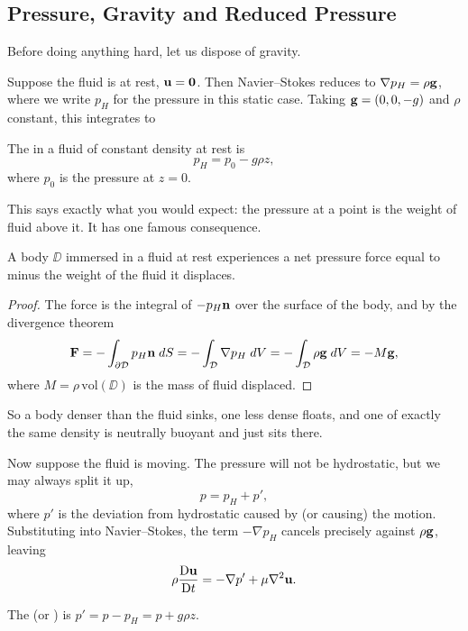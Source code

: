 \documentclass[a4paper]{scrartcl}
\newcommand{\D}{\mathrm{D}}
\newcommand{\Dt}[1]{\frac{\D #1}{\D t}}
\begin{document}
\subsection{Pressure, Gravity and Reduced Pressure}

Before doing anything hard, let us dispose of gravity.

Suppose the fluid is at rest, $\mathbf{u} = \mathbf{0}$. Then Navier--Stokes reduces to $\nabla p_H = \rho \mathbf{g}$, where we write $p_H$ for the pressure in this static case. Taking $\mathbf{g} = (0, 0, -g)$ and $\rho$ constant, this integrates to

\begin{definition}
	The  in a fluid of constant density at rest is
	$$
	p_H = p_0 - g \rho z,
	$$
	where $p_0$ is the pressure at $z = 0$.
\end{definition}

This says exactly what you would expect: the pressure at a point is the weight of fluid above it. It has one famous consequence.

\begin{proposition}
	A body $\DD$ immersed in a fluid at rest experiences a net pressure force equal to minus the weight of the fluid it displaces.
\end{proposition}
\begin{proof}
	The force is the integral of $-p_H \mathbf{n}$ over the surface of the body, and by the divergence theorem
	$$
	\mathbf{F} = -\int_{\partial \mathcal{D}} p_H \mathbf{n} \; d S = -\int_{\mathcal{D}} \nabla p_H \; d V = -\int_{\mathcal{D}} \rho \mathbf{g} \; d V = -M \mathbf{g},
	$$
	where $M = \rho \, \mathrm{vol}(\DD)$ is the mass of fluid displaced. \qedhere
\end{proof}

So a body denser than the fluid sinks, one less dense floats, and one of exactly the same density is neutrally buoyant and just sits there.

Now suppose the fluid is moving. The pressure will not be hydrostatic, but we may always split it up,
$$
p = p_H + p',
$$
where $p'$ is the deviation from hydrostatic caused by (or causing) the motion. Substituting into Navier--Stokes, the term $-\nabla p_H$ cancels precisely against $\rho \mathbf{g}$, leaving
$$
\rho \Dt{\vv u} = -\nabla p' + \mu \nabla^2 \vv u.
$$

\begin{definition}
	The  (or )  is $p' = p - p_H = p + g\rho z$.
\end{definition}
\end{document}

